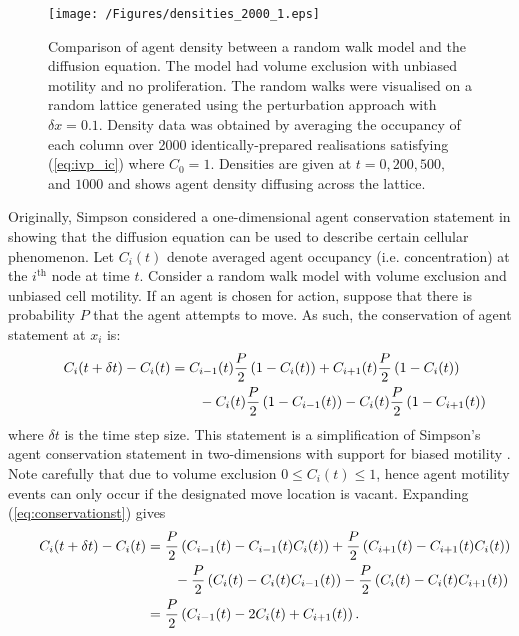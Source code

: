 \documentclass[11pt,titlepage,a4paper]{article}
\begin{document}
			\begin{figure}[tbh]
				\centering
					\texttt{[image: /Figures/densities\_2000\_1.eps]}
				\caption{Comparison of agent density between a random walk model and the diffusion equation. The model had volume exclusion with unbiased motility and no proliferation. The random walks were visualised on a random lattice generated using the perturbation approach with $\delta x = 0.1$. Density data was obtained by averaging the occupancy of each column over 2000 identically-prepared realisations satisfying (\ref{eq:ivp_ic}) where $C_0 = 1$. Densities are given at $t = 0, 200, 500,$ and $1000$ and shows agent density diffusing across the lattice.}
				\label{fig:densities_2000_1}
			\end{figure}

			Originally, Simpson considered a one-dimensional agent conservation statement in showing that the diffusion equation can be used to describe certain cellular phenomenon. Let $C_i(t)$ denote averaged agent occupancy (i.e. concentration) at the $i^{\text{th}}$ node at time $t$. Consider a random walk model with volume exclusion and unbiased cell motility. If an agent is chosen for action, suppose that there is probability $P$ that the agent attempts to move. As such, the conservation of agent statement at $x_i$ is:
			\begin{equation}
			  	\phantom{C(x_i, t + \delta t) - C(x_i, t)}
			  	\begin{aligned}
			    	\mathllap{C_i(t + \delta t) - C_i(t)} &= C_{i-1}(t) \frac{P}{2} \left(1 - C_i(t) \right) + C_{i+1}(t) \frac{P}{2} \left(1 - C_i(t) \right)\\
			      	&\qquad  - C_i(t) \frac{P}{2} \left(1 - C_{i-1}(t) \right) - C_i(t) \frac{P}{2} \left(1 - C_{i+1}(t) \right)
			  	\end{aligned}
			  	\label{eq:conservationst}
		  	\end{equation}
			where $\delta t$ is the time step size. This statement is a simplification of Simpson's agent conservation statement in two-dimensions with support for biased motility \cite{simpson2009diffusing}. Note carefully that due to volume exclusion $0 \le C_i(t) \le 1$, hence agent motility events can only occur if the designated move location is vacant. Expanding (\ref{eq:conservationst}) gives
			\begin{align*}
			  	\phantom{C(x_i, t + \delta t) - C(x_i, t)}
			  	&\begin{aligned}
			    	\mathllap{C_i(t + \delta t) - C_i(t)} &= \frac{P}{2} \left(C_{i-1}(t) - C_{i-1}(t)C_i(t) \right) + \frac{P}{2} \left(C_{i+1}(t) - C_{i+1}(t)C_i(t) \right) \\
			      	&\qquad - \frac{P}{2} \left(C_i(t) - C_i(t)C_{i-1}(t) \right) - \frac{P}{2} \left(C_i(t) - C_i(t)C_{i+1}(t) \right)
			  	\end{aligned}\\
			  	&\begin{aligned}
			    	\mathllap{} &= \frac{P}{2} \left(C_{i-1}(t) - 2 C_i(t) + C_{i+1}(t) \right).
			  	\end{aligned}
		  	\end{align*}
\end{document}
